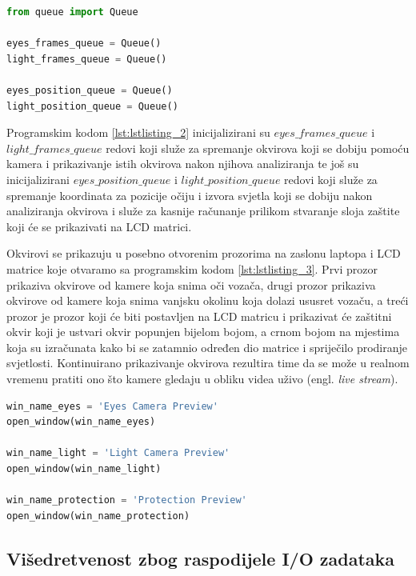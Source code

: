 \documentclass{foi}
\begin{document}
\begin{lstlisting}[language=Python, label={lst:lstlisting_2}, firstnumber=4, style=colored, caption=Uključivanje biblioteke $queue$ i inicijaliziranje redova]
from queue import Queue

eyes_frames_queue = Queue()
light_frames_queue = Queue()

eyes_position_queue = Queue()
light_position_queue = Queue()
\end{lstlisting}

Programskim kodom \ref{lst:lstlisting_2} inicijalizirani su  $eyes\_frames\_queue$ i $light\_frames\_queue$ redovi koji služe za spremanje okvirova koji se dobiju pomoću kamera i prikazivanje istih okvirova nakon njihova analiziranja te još su inicijalizirani $eyes\_position\_queue$ i $light\_position\_queue$ redovi koji služe za spremanje koordinata za pozicije očiju i izvora svjetla koji se dobiju nakon analiziranja okvirova i služe za kasnije računanje prilikom stvaranje sloja zaštite koji će se prikazivati na LCD matrici.

Okvirovi se prikazuju u posebno otvorenim prozorima na zaslonu laptopa i LCD matrice koje otvaramo sa programskim kodom \ref{lst:lstlisting_3}. Prvi prozor prikaziva okvirove od kamere koja snima oči vozača, drugi prozor prikaziva okvirove od kamere koja snima vanjsku okolinu koja dolazi ususret vozaču, a treći prozor je prozor koji će biti postavljen na LCD matricu i prikazivat će zaštitni okvir koji je ustvari okvir popunjen bijelom bojom, a crnom bojom na mjestima koja su izračunata kako bi se zatamnio određen dio matrice i spriječilo prodiranje svjetlosti. Kontinuirano prikazivanje okvirova rezultira time da se može u realnom vremenu pratiti ono što kamere gledaju u obliku videa uživo (engl. \emph{live stream}).

\begin{lstlisting}[language=Python, label={lst:lstlisting_3}, firstnumber=142, style=colored, caption=Otvaranje prozora na zaslonu]
win_name_eyes = 'Eyes Camera Preview'
open_window(win_name_eyes)

win_name_light = 'Light Camera Preview'
open_window(win_name_light)

win_name_protection = 'Protection Preview'
open_window(win_name_protection)
\end{lstlisting}

\subsection{Višedretvenost zbog raspodijele I/O zadataka}
\end{document}

